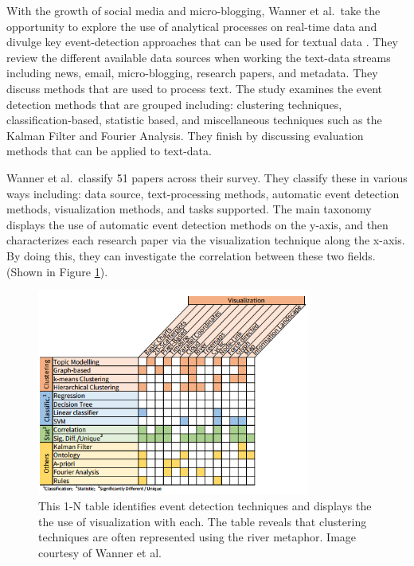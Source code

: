 With the growth of social media and micro-blogging, Wanner et al.\ take the opportunity to explore the use of analytical processes on real-time data and divulge key event-detection approaches that can be used for textual data \cite{wanner2014state}.
They review the different available data sources when working the text-data streams including news, email, micro-blogging, research papers, and metadata. They discuss methods that are used to process text. The study examines the event detection methods that are grouped including: clustering techniques, classification-based, statistic based, and miscellaneous techniques such as the Kalman Filter and Fourier Analysis. They finish  by discussing evaluation methods that can be applied to text-data. 

Wanner et al.\ classify 51 papers across their survey. They classify these in various ways including: data source, text-processing methods, automatic event detection methods, visualization methods, and tasks supported. The main taxonomy displays the use of automatic event detection methods on the y-axis, and then characterizes each research paper via the visualization technique along the x-axis. By doing this, they can investigate the correlation between these two fields. (Shown in Figure \ref{fig: wanner2014state}).

\begin{figure}[t]
\begin{center}
\includegraphics[width=0.8\textwidth]{images/wanner2014state.png}
\caption{This 1-N table identifies event detection techniques and displays the the use of visualization with each. The table reveals that clustering techniques are  often represented using the river metaphor. Image courtesy of Wanner et al.\ \cite{wanner2014state}} \label{fig: wanner2014state}
\end{center}
\end{figure}

